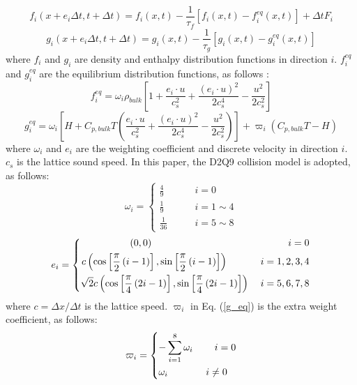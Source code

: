 \documentclass[preprint,12pt]{elsarticle}
\begin{document}
\begin{equation}
	f_i(x+e_i\Delta t,t+\Delta t)=f_i(x,t)-\frac{1}{\tau_f}[f_i(x,t)-f_i^{eq}(x,t)]+\Delta t F_i
	\label{Evolutions_of_Density}
\end{equation}
\begin{equation}
	g_i(x+e_i\Delta t,t+\Delta t)=g_i(x,t)-\frac{1}{\tau_g}[g_i(x,t)-g_i^{eq}(x,t)]
	\label{Evolutions_of_Enthalpy}
\end{equation}
where $f_i$ and $g_i$ are density and enthalpy distribution functions in direction $i$. $f_i^{eq}$ and $g_i^{eq}$ are the equilibrium distribution functions, as follows \cite{RN570}:
\begin{equation}
	f_i^{eq}=\omega_i\rho_{bulk}
	\left[
	1+\frac{e_i\cdot u}{c_s^2}+
	\frac{{
			\left(e_i\cdot u\right)
		}^2}{2c_s^4}
	-\frac{u^2}{2c_s^2}
	\right]
	\label{f_eq}
\end{equation}
\begin{equation}
	g_i^{eq}=\omega_i
	\left[
	H+C_{p,bulk}T
	\left(
	\frac{e_i\cdot u}{c_s^2}+\frac{
		\left(e_i\cdot u\right)			
		^2}{2c_s^4}
	-\frac{u^2}{2c_s^2}
	\right)
	\right]
	+\varpi_i(C_{p,bulk}T-H)
	\label{g_eq}
\end{equation}
where $\omega_i$ and $e_i$ are the weighting coefficient and discrete velocity in direction $i$. $c_s$ is the lattice sound speed. In this paper, the D2Q9 collision model is adopted, as follows:
\begin{equation}
	\omega_i=
	\left\{
	\begin{aligned}
		\frac{4}{9}\qquad &i=0 \\
		\frac{1}{9}\qquad &i=1\sim4 \\
		\frac{1}{36}\qquad&i=5\sim8
	\end{aligned}
	\label{omega_i}
	\right.
\end{equation}
\begin{equation}
	{e_i} = \left\{ 
	\begin{aligned}
		\left( {0,0} \right)\;\;\;\;\;\;\;\;\;\;\;\;\;\;\;\;\;\;\;\;\;\;\;\;\;\;\;\;\;\;\;\;\;\;\;\;\;\;\;\;\;\;\;\;\;\;\;\;\;\;i = 0 \hfill \\
		c\left( {\cos \left[ {\frac{\pi }{2}\left( {i - 1} \right)} \right],\sin \left[ {\frac{\pi }{2}\left( {i - 1} \right)} \right]} \right)\;\;\;\;\;\;\;\;\;\;\;\;i = 1,2,3,4 \hfill \\
		\sqrt 2 c\left( {\cos \left[ {\frac{\pi }{4}\left( {2i - 1} \right)} \right],\sin \left[ {\frac{\pi }{4}\left( {2i - 1} \right)} \right]} \right)\;\;\;\;i = 5,6,7,8 \hfill \\ 
	\end{aligned} 
	\right.
\end{equation}
where $c=\Delta x/\Delta t$ is the lattice speed. $\varpi_i$ in Eq. (\ref{g_eq}) is the extra weight coefficient, as follows:
\begin{equation}
	{\varpi _i} = \left\{ \begin{gathered}
		- \sum\limits_{i = 1}^8 {{\omega _i}} \;\;\;\;\;\;\;\;i = 0 \hfill \\
		{\omega _i}\;\;\;\;\;\;\;\;\;\;\;\;\;\;i \ne 0 \hfill \\ 
	\end{gathered}  \right.
\end{equation}
\end{document}
